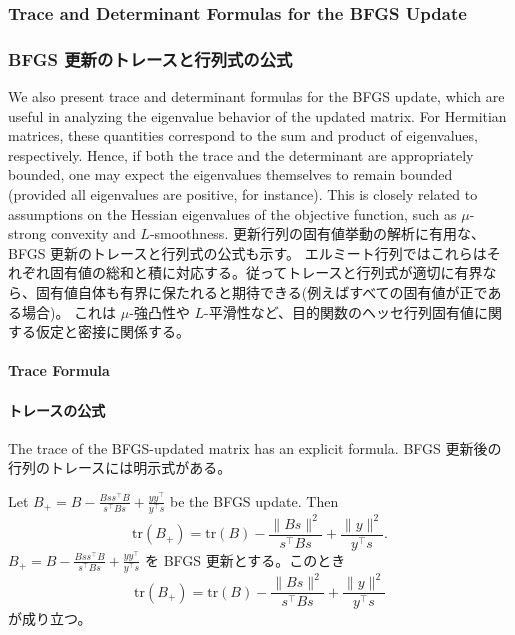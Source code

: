 \documentclass[0_main]{subfiles}
\begin{document}
\ifEn
    \subsubsection{Trace and Determinant Formulas for the BFGS Update}
\else
    \subsubsection{BFGS 更新のトレースと行列式の公式}
\fi

\ifEn
    We also present trace and determinant formulas for the BFGS update, which are useful in analyzing the eigenvalue behavior of the updated matrix.
    For Hermitian matrices, these quantities correspond to the sum and product of eigenvalues, respectively. Hence, if both the trace and the determinant are appropriately bounded, one may expect the eigenvalues themselves to remain bounded (provided all eigenvalues are positive, for instance).
    This is closely related to assumptions on the Hessian eigenvalues of the objective function, such as $\mu$-strong convexity and $L$-smoothness.
\else
    更新行列の固有値挙動の解析に有用な、BFGS 更新のトレースと行列式の公式も示す。
    エルミート行列ではこれらはそれぞれ固有値の総和と積に対応する。従ってトレースと行列式が適切に有界なら、固有値自体も有界に保たれると期待できる(例えばすべての固有値が正である場合)。
    これは $\mu$-強凸性や $L$-平滑性など、目的関数のヘッセ行列固有値に関する仮定と密接に関係する。
\fi

\ifEn
    \paragraph{Trace Formula}
\else
    \paragraph{トレースの公式}
\fi

\ifEn
    The trace of the BFGS-updated matrix has an explicit formula.
\else
    BFGS 更新後の行列のトレースには明示式がある。
\fi

\begin{proposition}\label{prop:bfgs-trace}
    \ifEn
        Let $B_{+} = B - \frac{Bss^\top B}{s^\top Bs} + \frac{yy^\top}{y^\top s}$ be the BFGS update. Then
        \begin{equation*}
            \mathrm{tr}(B_{+}) = \mathrm{tr}(B) - \frac{\lVert B s \rVert^2}{s^\top Bs} + \frac{\lVert y \rVert^2}{y^\top s}.
        \end{equation*}
    \else
        $B_{+} = B - \frac{Bss^\top B}{s^\top Bs} + \frac{yy^\top}{y^\top s}$ を BFGS 更新とする。このとき
        \begin{equation*}
            \mathrm{tr}(B_{+}) = \mathrm{tr}(B) - \frac{\lVert B s \rVert^2}{s^\top Bs} + \frac{\lVert y \rVert^2}{y^\top s}
        \end{equation*}
        が成り立つ。
    \fi
\end{proposition}
\end{document}
